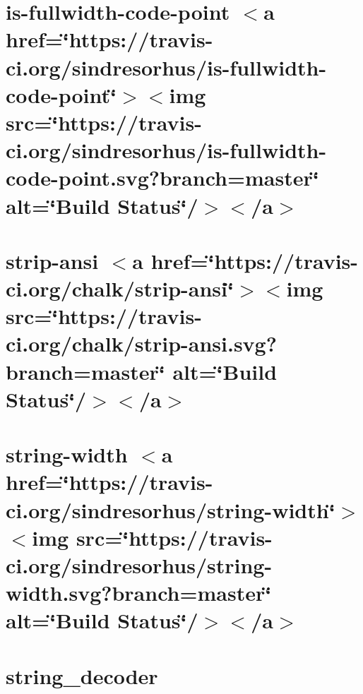 \let\mypdfximage\pdfximage\def\pdfximage{\immediate\mypdfximage}\documentclass[twoside]{book}
\newcommand{\+}{\discretionary{\mbox{\scriptsize$\hookleftarrow$}}{}{}}
\begin{document}
\chapter{is-\/fullwidth-\/code-\/point $<$a href=\char`\"{}https\+://travis-\/ci.\+org/sindresorhus/is-\/fullwidth-\/code-\/point\char`\"{}$>$$<$img src=\char`\"{}https\+://travis-\/ci.\+org/sindresorhus/is-\/fullwidth-\/code-\/point.\+svg?branch=master\char`\"{} alt=\char`\"{}\+Build Status\char`\"{}/$>$$<$/a$>$}
\label{md__c_1__git_hub__p_r_o_y_e_c_t_o-_i_i_i-_g_o_t_rest-api-node-mysql_node_modules_string-width_no67d52253440e087d765c0bbdb4ed57c2}

\chapter{strip-\/ansi $<$a href=\char`\"{}https\+://travis-\/ci.\+org/chalk/strip-\/ansi\char`\"{}$>$$<$img src=\char`\"{}https\+://travis-\/ci.\+org/chalk/strip-\/ansi.\+svg?branch=master\char`\"{} alt=\char`\"{}\+Build Status\char`\"{}/$>$$<$/a$>$}
\label{md__c_1__git_hub__p_r_o_y_e_c_t_o-_i_i_i-_g_o_t_rest-api-node-mysql_node_modules_string-width_node_modules_strip-ansi_readme}

\chapter{string-\/width $<$a href=\char`\"{}https\+://travis-\/ci.\+org/sindresorhus/string-\/width\char`\"{}$>$$<$img src=\char`\"{}https\+://travis-\/ci.\+org/sindresorhus/string-\/width.\+svg?branch=master\char`\"{} alt=\char`\"{}\+Build Status\char`\"{}/$>$$<$/a$>$}
\label{md__c_1__git_hub__p_r_o_y_e_c_t_o-_i_i_i-_g_o_t_rest-api-node-mysql_node_modules_string-width_readme}

\chapter{string\+\_\+decoder}
\label{md__c_1__git_hub__p_r_o_y_e_c_t_o-_i_i_i-_g_o_t_rest-api-node-mysql_node_modules_string_decoder__r_e_a_d_m_e}

\end{document}
